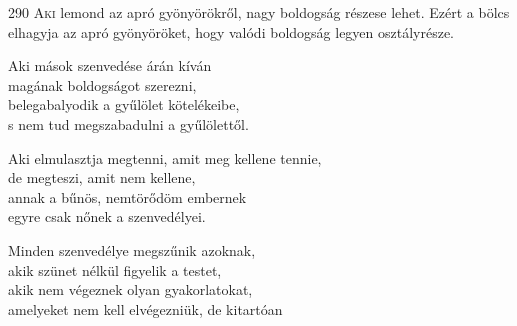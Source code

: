 
\begin{firstdhpverse}{290}
\lettrine[slope=0.5em]{A}{ki} {\LettrineTextFont lemond az apró gyönyörökről,}\newline
nagy boldogság részese lehet. Ezért a bölcs\newline
elhagyja az apró gyönyöröket,\newline
hogy valódi boldogság legyen osztályrésze.
\end{firstdhpverse}

\begin{dhpverse}

 Aki mások szenvedése árán kíván\\
magának boldogságot szerezni,\\
belegabalyodik a gyűlölet kötelékeibe,\\
s nem tud megszabadulni a gyűlölettől.

 Aki elmulasztja megtenni, amit meg kellene tennie,\\
de megteszi, amit nem kellene,\\
annak a bűnös, nemtörődöm embernek\\
egyre csak nőnek a szenvedélyei.

 Minden szenvedélye megszűnik azoknak,\\
akik szünet nélkül figyelik a testet,\\
akik nem végeznek olyan gyakorlatokat,\\
amelyeket nem kell elvégezniük, de kitartóan

\end{dhpverse}
\newpage
